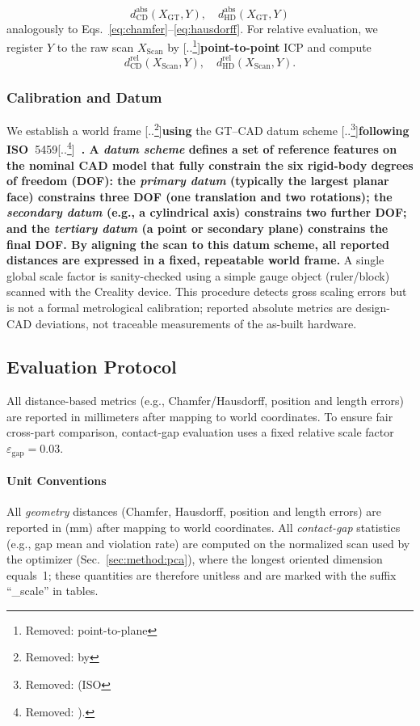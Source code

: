 \documentclass{ieeeaccess}
\providecommand{\DIFaddtex}[1]{{\color{blue}\bfseries #1}} %
\providecommand{\DIFdeltex}[1]{{\color{red}[..\footnote{\color{black}Removed: #1}]}} %
\providecommand{\DIFaddbegin}{} %
\providecommand{\DIFaddend}{} %
\providecommand{\DIFdelbegin}{} %
\providecommand{\DIFdelend}{} %
\providecommand{\DIFadd}[1]{\texorpdfstring{\DIFaddtex{#1}}{#1}} %
\providecommand{\DIFdel}[1]{\texorpdfstring{\DIFdeltex{#1}}{}} %
\begin{document}
\[
d_{\mathrm{CD}}^{\mathrm{abs}}(X_{\mathrm{GT}},Y),\quad
d_{\mathrm{HD}}^{\mathrm{abs}}(X_{\mathrm{GT}},Y)
\]
analogously to Eqs.~\eqref{eq:chamfer}–\eqref{eq:hausdorff}.
For relative evaluation, we register $Y$ to the raw scan $X_{\mathrm{Scan}}$ by \DIFdelbegin \DIFdel{point-to-plane }\DIFdelend \DIFaddbegin \DIFadd{point-to-point }\DIFaddend ICP and compute
\[
d_{\mathrm{CD}}^{\mathrm{rel}}(X_{\mathrm{Scan}},Y),\quad
d_{\mathrm{HD}}^{\mathrm{rel}}(X_{\mathrm{Scan}},Y).
\]


\subsubsection{Calibration and Datum}
\label{sec:calibration}
We establish a world frame \DIFdelbegin \DIFdel{by }\DIFdelend \DIFaddbegin \DIFadd{using }\DIFaddend the GT--CAD datum scheme \DIFdelbegin \DIFdel{(ISO}\DIFdelend \DIFaddbegin \DIFadd{following ISO~}\DIFaddend 5459\DIFdelbegin \DIFdel{). }\DIFdelend \DIFaddbegin \DIFadd{~\cite{b16}.
A \emph{datum scheme} defines a set of reference features on the nominal CAD model that
fully constrain the six rigid-body degrees of freedom (DOF):
the \emph{primary datum} (typically the largest planar face) constrains three DOF
(one translation and two rotations);
the \emph{secondary datum} (e.g., a cylindrical axis) constrains two further DOF;
and the \emph{tertiary datum} (a point or secondary plane) constrains the final DOF.
By aligning the scan to this datum scheme, all reported distances are expressed in a
fixed, repeatable world frame.
}\DIFaddend A single global scale factor is sanity-checked using a simple gauge object (ruler/block)
scanned with the Creality device.
This procedure detects gross scaling errors but is not a formal metrological calibration;
reported absolute metrics are design-CAD deviations, not traceable measurements of the
as-built hardware.


\subsection{Evaluation Protocol}
All distance-based metrics (e.g., Chamfer/Hausdorff, position and length errors)
are reported in millimeters after mapping to world coordinates. To ensure fair
cross-part comparison, contact-gap evaluation uses a fixed relative scale factor
$\varepsilon_{\mathrm{gap}} = 0.03$.

\paragraph*{Unit Conventions}
\label{sec:unit_conventions}
All \emph{geometry} distances (Chamfer, Hausdorff, position and length errors) are reported in (mm) after mapping to world coordinates.
All \emph{contact-gap} statistics (e.g., gap mean and violation rate) are computed on the
normalized scan used by the optimizer (Sec.~\ref{sec:method:pca}), where the longest oriented
dimension equals~1; these quantities are therefore unitless and are marked with the suffix
``\_scale'' in tables.
\end{document}
